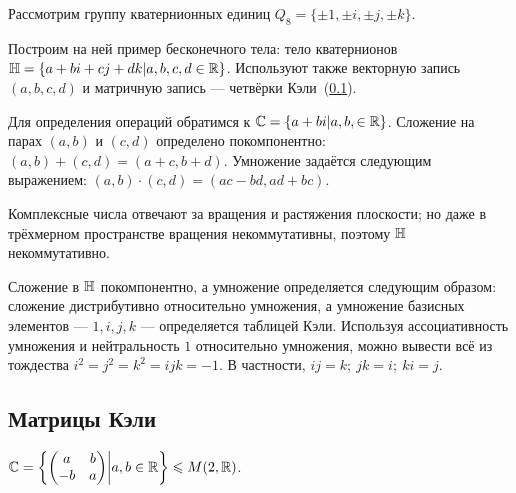 \documentclass[a4paper]{report}
\begin{document}
    Рассмотрим группу кватернионных единиц $Q_8 = \{\pm1, \pm i, \pm j, \pm k\}$.

    Построим на ней пример бесконечного тела: тело кватернионов $\mathbb{H} = \left\{a + bi + cj + dk\middle|a, b, c, d \in \mathbb{R}\right\}$.
    Используют также векторную запись $(a, b, c, d)$ и матричную запись --- четвёрки Кэли~(\cref{subsec:cayley_matrices}).

    Для определения операций обратимся к $\mathbb{C} = \left\{a + bi\middle|a, b, \in \mathbb{R}\right\}$.
    Сложение на парах $(a, b)$ и $(c, d)$ определено покомпонентно: $(a, b) + (c, d) = (a + c, b + d)$.
    Умножение задаётся следующим выражением: $(a, b) \cdot (c, d) = (ac - bd, ad + bc)$.

    Комплексные числа отвечают за вращения и растяжения плоскости;
    но даже в трёхмерном пространстве вращения некоммутативны, поэтому $\mathbb{H}$ некоммутативно.

    Сложение в $\mathbb{H}$ покомпонентно, а умножение определяется следующим образом: сложение дистрибутивно относительно умножения, а умножение базисных элементов --- $1, i, j, k$ --- определяется таблицей Кэли.
    Используя ассоциативность умножения и нейтральность $1$ относительно умножения, можно вывести всё из тождества $i^2 = j^2 = k^2 = ijk = -1$.
    В частности, $ij = k; ~jk = i; ~ ki = j$.


    \subsection{Матрицы Кэли}
    \label{subsec:cayley_matrices}
    $\mathbb{C} = \left\{\begin{pmatrix}a&b\\-b&a\end{pmatrix}\middle|a, b \in \mathbb{R}\right\} \leqslant M(2, \mathbb{R})$.
\end{document}
